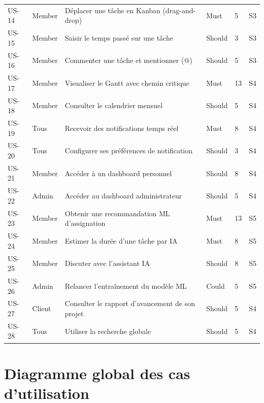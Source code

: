\begin{longtable}{C{1.2cm}L{2cm}L{6.5cm}C{2cm}C{1.5cm}C{1.5cm}}
  US-14 & Member  & Déplacer une tâche en Kanban (drag-and-drop)        & Must    & 5  & S3 \\
  US-15 & Member  & Saisir le temps passé sur une tâche                 & Should  & 3  & S3 \\
  US-16 & Member  & Commenter une tâche et mentionner (@)               & Should  & 5  & S3 \\
  US-17 & Member  & Visualiser le Gantt avec chemin critique            & Must    & 13 & S4 \\
  US-18 & Member  & Consulter le calendrier mensuel                     & Should  & 5  & S4 \\
  US-19 & Tous    & Recevoir des notifications temps réel               & Must    & 8  & S4 \\
  US-20 & Tous    & Configurer ses préférences de notification          & Should  & 3  & S4 \\
  US-21 & Member  & Accéder à un dashboard personnel                   & Should  & 8  & S4 \\
  US-22 & Admin   & Accéder au dashboard administrateur                 & Should  & 5  & S4 \\
  US-23 & Member  & Obtenir une recommandation ML d'assignation         & Must    & 13 & S5 \\
  US-24 & Member  & Estimer la durée d'une tâche par IA                 & Must    & 8  & S5 \\
  US-25 & Member  & Discuter avec l'assistant IA                        & Should  & 8  & S5 \\
  US-26 & Admin   & Relancer l'entraînement du modèle ML                & Could   & 5  & S5 \\
  US-27 & Client  & Consulter le rapport d'avancement de son projet     & Should  & 5  & S4 \\
  US-28 & Tous    & Utiliser la recherche globale                       & Should  & 5  & S4 \\
\end{longtable}

\section{Diagramme global des cas d'utilisation}

